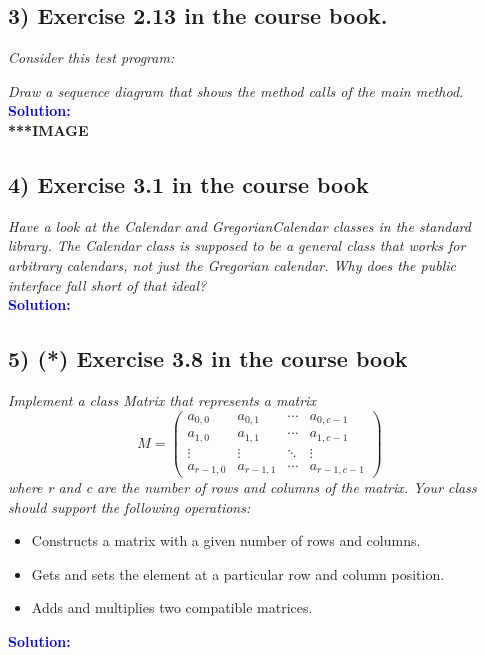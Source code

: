 \documentclass{article}
\begin{document}
\subsection*{3) Exercise 2.13 in the course book.}
\textit{Consider this test program:}

\textit{Draw a sequence diagram that shows the method calls of the main method.} \\
\indent \textbf{\textcolor{blue}{Solution:}} \\
\textbf{***IMAGE}

\subsection*{4) Exercise 3.1 in the course book}
\textit{
    Have a look at the Calendar and GregorianCalendar classes in
    the standard library. The Calendar class is supposed to be a general class that works for arbitrary
    calendars, not just the Gregorian calendar. Why does the public interface fall short of that ideal?}\\
    \indent \textbf{\textcolor{blue}{Solution:}} \\


\subsection{5) (*) Exercise 3.8 in the course book}
\textit{Implement a class Matrix that represents a matrix}\\
$$ 
M = \left( 
\begin{matrix}
a_{0,0} & a_{0,1} & \cdots & a_{0,c-1} \\
a_{1,0} & a_{1,1} & \cdots & a_{1,c-1} \\
\vdots & \vdots & \ddots & \vdots \\
a_{r-1,0} & a_{r-1,1} & \cdots & a_{r-1,c-1} 
\end{matrix} \right)
$$
\textit{
where r and c are the number of rows and columns of the matrix. Your class should support the
following operations:}\\
\begin{itemize}
    \item Constructs a matrix with a given number of rows and columns.
    \item Gets and sets the element at a particular row and column position.
    \item Adds and multiplies two compatible matrices.
\end{itemize}
\indent \textbf{\textcolor{blue}{Solution:}} \\
\end{document}
